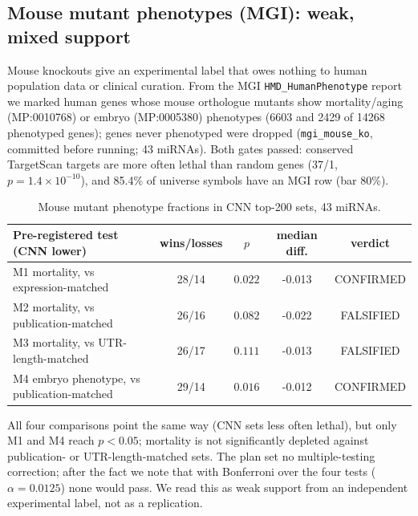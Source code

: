 \subsection{Mouse mutant phenotypes (MGI): weak, mixed support}
Mouse knockouts give an experimental label that owes nothing to human population data or clinical curation. From the MGI \texttt{HMD\_HumanPhenotype} report~\cite{mgi} we marked human genes whose mouse orthologue mutants show mortality/aging (MP:0010768) or embryo (MP:0005380) phenotypes (6603 and 2429 of 14268 phenotyped genes); genes never phenotyped were dropped (\texttt{mgi\_mouse\_ko}, committed before running; 43 miRNAs). Both gates passed: conserved TargetScan targets are more often lethal than random genes (37/1, $p=1.4\times10^{-10}$), and 85.4\% of universe symbols have an MGI row (bar 80\%).
\begin{table}[h]\centering\small\begin{tabular}{lcccc}\hline Pre-registered test (CNN lower) & wins/losses & $p$ & median diff. & verdict\\\hline
M1 mortality, vs expression-matched & 28/14 & $0.022$ & -0.013 & CONFIRMED \\
M2 mortality, vs publication-matched & 26/16 & $0.082$ & -0.022 & FALSIFIED \\
M3 mortality, vs UTR-length-matched & 26/17 & $0.111$ & -0.013 & FALSIFIED \\
M4 embryo phenotype, vs publication-matched & 29/14 & $0.016$ & -0.012 & CONFIRMED \\
\hline\end{tabular}\caption{Mouse mutant phenotype fractions in CNN top-200 sets, 43 miRNAs.}\label{tab:mgi}\end{table}
All four comparisons point the same way (CNN sets less often lethal), but only M1 and M4 reach $p<0.05$; mortality is not significantly depleted against publication- or UTR-length-matched sets. The plan set no multiple-testing correction; after the fact we note that with Bonferroni over the four tests ($\alpha=0.0125$) none would pass. We read this as weak support from an independent experimental label, not as a replication.
